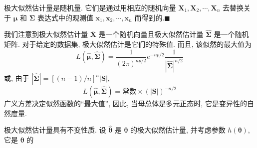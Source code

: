 极大似然估计量是随机量. 它们是通过用相应的随机向量 $\mathbf{X}_{1},\mathbf{X}_{2},\cdots,\mathbf{X}_{n}$ 去替换关于 $\boldsymbol{\mu}$ 和 $\boldsymbol{\Sigma}$ 表达式中的观测值 $\mathbf{x}_{1},\mathbf{x}_{2},\cdots,\mathbf{x}_{n}$ 而得到的.\hfill$\blacksquare$

我们注意到极大似然估计量 $\bar{\mathbf{X}}$ 是一个随机向量且极大似然估计量 $\hat{\boldsymbol{\Sigma}}$ 是一个随机矩阵. 对于给定的数据集, 极大似然估计是它们的特殊值. 而且, 该似然的最大值为
\label{eq:4-18}
\begin{equation}
L(\hat{\boldsymbol{\mu}},\hat{\boldsymbol{\Sigma}})=\frac{1}{(2\pi)^{np/2}}e^{-np/2}\frac{1}{|\hat{\boldsymbol{\Sigma}}|^{n/2}} \tag{4-18}
\end{equation}
或, 由于 $|\hat{\boldsymbol{\Sigma}}|=[(n-1)/n]^{n}|\mathbf{S}|$,
\label{eq:4-19}
\begin{equation}
L(\hat{\boldsymbol{\mu}},\hat{\boldsymbol{\Sigma}})=\text{常数}\times(|\mathbf{S}|)^{-n/2} \tag{4-19}
\end{equation}
广义方差决定似然函数的“最大值”, 因此, 当母总体是多元正态时, 它是变异性的自然度量.

极大似然估计量具有不变性质. 设 $\hat{\boldsymbol{\theta}}$ 是 $\boldsymbol{\theta}$ 的极大似然估计量, 并考虑参数 $h(\boldsymbol{\theta})$, 它是 $\boldsymbol{\theta}$ 的
